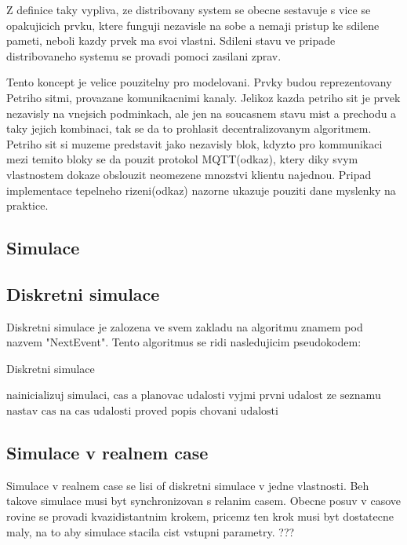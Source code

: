 Z definice taky vypliva, ze distribovany system se obecne sestavuje s vice se opakujicich prvku, ktere funguji nezavisle na sobe a nemaji pristup ke sdilene pameti, neboli kazdy prvek ma svoi vlastni. Sdileni stavu ve pripade distribovaneho systemu se provadi pomoci zasilani zprav.

Tento koncept je velice pouzitelny pro modelovani. Prvky budou reprezentovany Petriho sitmi, provazane komunikacnimi kanaly. Jelikoz kazda petriho sit je prvek nezavisly na vnejsich podminkach, ale jen na soucasnem stavu mist a prechodu a taky jejich kombinaci, tak se da to prohlasit decentralizovanym algoritmem. Petriho sit si muzeme predstavit jako nezavisly blok, kdyzto pro kommunikaci mezi temito bloky se da pouzit protokol MQTT(odkaz), ktery diky svym vlastnostem dokaze obslouzit neomezene mnozstvi klientu najednou. Pripad implementace tepelneho rizeni(odkaz) nazorne ukazuje pouziti dane myslenky na praktice.
\subsection{Simulace}
\subsection{Diskretni simulace}
Diskretni simulace je zalozena ve svem zakladu na algoritmu znamem pod nazvem "NextEvent". Tento algoritmus se ridi nasledujicim pseudokodem:
\begin{algorithm}
  \caption{Diskretni simulace}\label{euclid}
  \begin{algorithmic}[1]
  \State $\text{nainicializuj simulaci, cas a planovac udalosti}$
  \State $\text{vyjmi prvni udalost ze seznamu}$
  \Return
  \EndIf
  \State $\text{nastav cas na cas udalosti}$
  \State $\text{proved popis chovani udalosti}$
  \EndWhile
  \end{algorithmic}
  \end{algorithm}
\subsection{Simulace v realnem case}
Simulace v realnem case se lisi of diskretni simulace v jedne vlastnosti. Beh takove simulace musi byt synchronizovan s relanim casem. Obecne posuv v casove rovine se provadi kvazidistantnim krokem, pricemz ten krok musi byt dostatecne maly, na to aby simulace stacila cist vstupni parametry. ??? %

